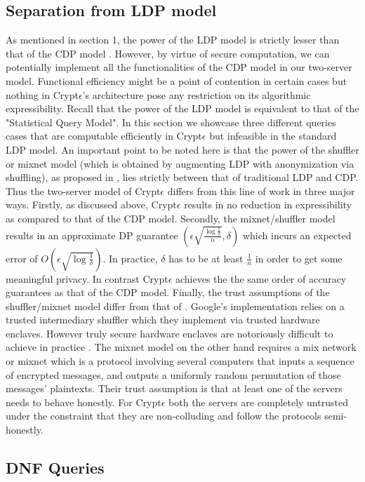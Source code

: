 \subsection{Separation from LDP model}
As mentioned in section 1, the power of the \textsf{LDP} model is strictly lesser than that of the \textsf{CDP} model \cite{Kasivi,mixnets}. However, by virtue of secure computation, we can potentially implement all the functionalities of the \textsf{CDP} model in our two-server model. Functional efficiency might be a point of contention in certain cases but nothing in Crypt$\epsilon$'s architecture pose any  restriction on its algorithmic expressibility. Recall that the power of the \textsf{LDP} model is equivalent to that of the "Statistical Query Model". In this section we showcase three different queries cases that are computable efficiently in Crypt$\epsilon$ but infeasible in the standard \textsf{LDP} model. 
An important point to be noted here is that the power of the shuffler or mixnet model  (which is obtained by augmenting \textsf{LDP} with anonymization via shuffling), as proposed in \cite{Prochlo, mixnets,amplification},  lies strictly between that of traditional \textsf{LDP} and \textsf{CDP}. Thus the two-server model of Crypt$\epsilon$ differs from this line of work in three major ways. Firstly, as discussed above, Crypt$\epsilon$ results in no reduction in expressibility as compared to that of the \textsf{CDP} model. Secondly, the mixnet/shuffler model results in an approximate DP guarantee $(\epsilon\sqrt{\frac{\log\frac{1}{\delta}}{n}},\delta)$ which incurs an expected error of $O(\epsilon\sqrt{\log\frac{1}{\delta}})$.  In practice, $\delta$ has to be at least $\frac{1}{n}$ in order to get some meaningful privacy. In contrast Crypt$\epsilon$ achieves the the same order of accuracy guarantees as that of the \textsf{CDP} model. Finally, the trust assumptions of the shuffler/mixnet model differ from that of \system. Google's implementation relies on a trusted intermediary shuffler which they implement via trusted hardware enclaves. However truly secure hardware enclaves are notoriously difficult to achieve in practice \cite{Foreshadow}. The mixnet model on the other hand requires a  mix network or mixnet which is a protocol involving several computers that inputs a sequence
of encrypted messages, and outputs a uniformly random permutation of those messages' plaintexts.  Their trust assumption is that at least one of the servers needs to behave honestly. For Crypt$\epsilon$ both the servers are completely untrusted under the constraint that they are non-colluding and follow the protocols semi-honestly. \subsection*{DNF Queries}
